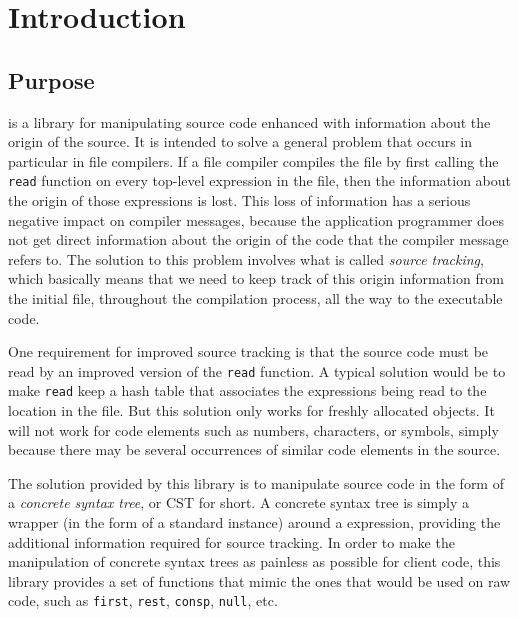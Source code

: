 \chapter{Introduction}
%

\section{Purpose}

\sysname{} is a library for manipulating \commonlisp{} source code
enhanced with information about the origin of the source.  It is
intended to solve a general problem that occurs in particular in
\commonlisp{} file compilers.  If a file compiler compiles the file by
first calling the \commonlisp{} \texttt{read} function on every
top-level expression in the file, then the information about the
origin of those expressions is lost.  This loss of information has a
serious negative impact on compiler messages, because the application
programmer does not get direct information about the origin of the
code that the compiler message refers to.  The solution to this
problem involves what is called \emph{source tracking}, which
basically means that we need to keep track of this origin information
from the initial file, throughout the compilation process, all the way
to the executable code.

One requirement for improved source tracking is that the source code
must be read by an improved version of the \texttt{read} function.
A typical solution would be to make \texttt{read} keep a hash table
that associates the expressions being read to the location in the
file.  But this solution only works for freshly allocated
\commonlisp{} objects.  It will not work for code elements such as
numbers, characters, or symbols, simply because there may be several
occurrences of similar code elements in the source.

The solution provided by this library is to manipulate \commonlisp{}
source code in the form of a \emph{concrete syntax tree}, or CST for
short.  A concrete syntax tree is simply a wrapper (in the form of a
standard instance) around a \commonlisp{} expression, providing the
additional information required for source tracking.  In order to make
the manipulation of concrete syntax trees as painless as possible for
client code, this library provides a set of functions that mimic the
ones that would be used on raw \commonlisp{} code, such as
\texttt{first}, \texttt{rest}, \texttt{consp}, \texttt{null}, etc.

